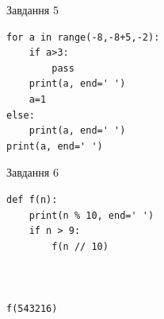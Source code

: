 \documentclass[12pt, ukrainian]{article}
\begin{document}
{\vspace{15mm}
\begin{minipage}[t]{9.7cm}                
{\begin{center}Завдання {5}\end{center}}
\begin{verbatim}
for a in range(-8,-8+5,-2):
    if a>3:
        pass
    print(a, end=' ')
    a=1
else:
    print(a, end=' ')
print(a, end=' ')
\end{verbatim}     
\end{minipage}
\vline \hspace{8mm}
\begin{minipage}[t]{8.0cm}                
{\begin{center}Завдання {6}\end{center}}
\begin{verbatim}
def f(n):
    print(n % 10, end=' ')
    if n > 9:
        f(n // 10)
    


f(543216)
\end{verbatim}     
\end{minipage}

}
\newpage
\end{document}
